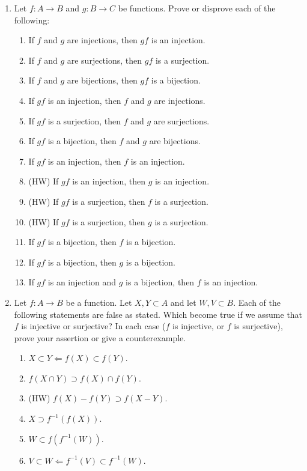 \documentclass[12pt, reqno]{amsart}
\begin{document}
\begin{enumerate}
\newpage
\item   Let $f\colon A \to B$ and $g \colon B \to C$ be functions. Prove or
  disprove each of the following:
  \begin{enumerate}
  \item If $f$ and $g$ are injections, then $gf$ is an injection.
  \item If $f$ and $g$ are surjections, then $gf$ is a surjection.
  \item If $f$ and $g$ are bijections, then $gf$ is a bijection.
  \item If $gf$ is an injection, then $f$ and $g$ are injections.
  \item If $gf$ is a surjection, then $f$ and $g$ are surjections.
  \item If $gf$ is a bijection, then $f$ and $g$ are bijections.
  \item If $gf$ is an injection, then $f$ is an injection.
  \item (HW) If $gf$ is an injection, then $g$ is an injection.
  \item (HW) If $gf$ is a surjection, then $f$ is a surjection.
  \item (HW) If $gf$ is a surjection, then $g$ is a surjection.
  \item If $gf$ is a bijection, then $f$ is a bijection.
  \item If $gf$ is a bijection, then $g$ is a bijection.
  \item If $gf$ is an injection and $g$ is a bijection, then $f$ is an
    injection.
  \end{enumerate}

\vspace{1in}

\item Let $f\colon A \to B$ be a function. Let $X,Y \subset
  A$ and let $W,V \subset B$. Each of the following statements are false as stated. Which
  become true if we assume that $f$ is injective or surjective? In
  each case ($f$ is injective, or $f$ is surjective), prove your
  assertion or give a counterexample.
  \begin{enumerate}
  \item $X \subset Y \Leftarrow f(X) \subset f(Y)$.
  \item $f(X \cap Y) \supset f(X) \cap f(Y)$.
  \item (HW) $f(X) - f(Y) \supset f(X - Y)$.
  \item $X \supset f^{-1}(f(X))$.
  \item $W \subset f(f^{-1}(W))$.
  \item $V \subset W \Leftarrow f^{-1}(V) \subset f^{-1}(W)$.
  \end{enumerate}


  
\end{enumerate}
\end{document}
